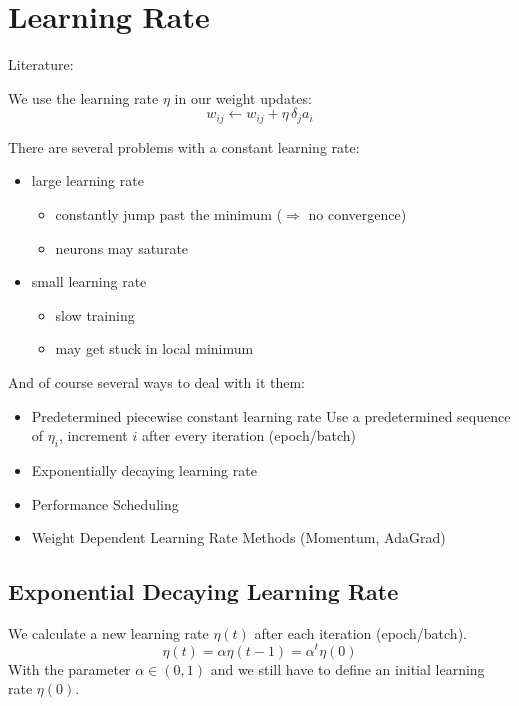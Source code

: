 \section{Learning Rate}\label{sec:learning-rate}
Literature: \cite[Chapter 6.8]{Duda2000}

We use the learning rate $\eta$ in our weight updates: $$w_{ij} \leftarrow w_{ij} + \eta\, \delta_j a_i$$

There are several problems with a constant learning rate:
\begin{itemize}
\item large learning rate
	\begin{itemize}
	\item constantly jump past the minimum ($\Rightarrow$ no convergence)
	\item neurons may saturate
	\end{itemize}
\item small learning rate
	\begin{itemize}
	\item slow training
	\item may get stuck in local minimum
	\end{itemize}
\end{itemize}

And of course several ways to deal with it them:
\begin{itemize}
\item Predetermined piecewise constant learning rate\newline
	Use a predetermined sequence of $\eta_i$, increment $i$ after every iteration (epoch/batch)
\item Exponentially decaying learning rate
\item Performance Scheduling
\item Weight Dependent Learning Rate Methods (\eg Momentum, AdaGrad)
\end{itemize}

\subsection{Exponential Decaying Learning Rate}
We calculate a new learning rate $\eta(t)$ after each iteration (epoch/batch).
\begin{equation}\label{eq:exponential-decaying-eta}
\eta(t)=\alpha\eta(t-1)=\alpha^t\eta(0)
\end{equation}
With the parameter $\alpha \in (0,1)$ and we still have to define an initial learning rate $\eta(0)$.

